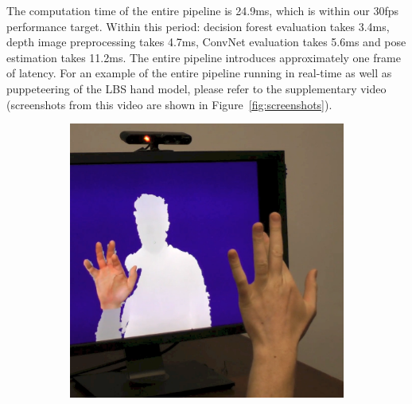 The computation time of the entire pipeline is 24.9ms, which is within our 30fps performance target. Within this period: decision forest evaluation takes 3.4ms, depth image preprocessing takes 4.7ms, ConvNet evaluation takes 5.6ms and pose estimation takes 11.2ms. The entire pipeline introduces approximately one frame of latency. For an example of the entire pipeline running in real-time as well as puppeteering of the LBS hand model, please refer to the supplementary video (screenshots from this video are shown in Figure~\ref{fig:screenshots}).

\begin{figure}[ht]
\centering
        \begin{subfigure}{0.3375\textwidth}
                \centering
                \includegraphics[width=\textwidth]{figures_1_hand_tracking/screenshot1_clipped}
                \caption{\footnotesize }
        \end{subfigure}
        \begin{subfigure}{0.28125\textwidth}
                \centering

\end{subfigure}
\end{figure}
